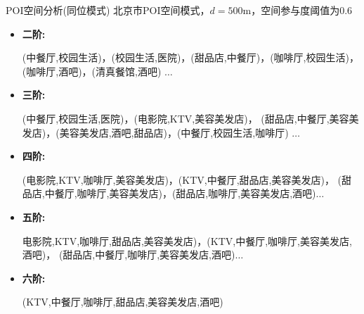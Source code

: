 \begin{frame}[c]{POI空间分析(同位模式)}
    北京市POI空间模式，$d=500$m，空间参与度阈值为$0.6$

    \begin{itemize}
        \footnotesize
        \pause
        \item \textbf{二阶:}

        (中餐厅,校园生活)，(校园生活,医院)，(甜品店,中餐厅)，(咖啡厅,校园生活)，(咖啡厅,酒吧)，(清真餐馆,酒吧) $\ldots$

        \pause
        \item \textbf{三阶:}

        (中餐厅,校园生活,医院)，(电影院,KTV,美容美发店)，
        (甜品店,中餐厅,美容美发店)，(美容美发店,酒吧,甜品店)，(中餐厅,校园生活,咖啡厅) $\ldots$

        \pause
        \item \textbf{四阶:}

        (电影院,KTV,咖啡厅,美容美发店)，(KTV,中餐厅,甜品店,美容美发店)，
        (甜品店,中餐厅,咖啡厅,美容美发店)，(甜品店,咖啡厅,美容美发店,酒吧)$\ldots$

        \pause
        \item \textbf{五阶:}

        电影院,KTV,咖啡厅,甜品店,美容美发店)，(KTV,中餐厅,咖啡厅,美容美发店,酒吧)，
        (甜品店,中餐厅,咖啡厅,美容美发店,酒吧)$\ldots$

        \pause
        \item \textbf{六阶:}

        (KTV,中餐厅,咖啡厅,甜品店,美容美发店,酒吧)
    \end{itemize}
\end{frame}